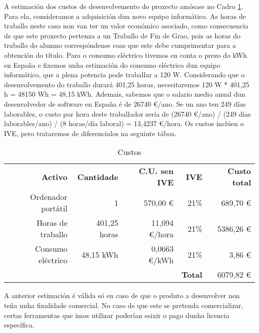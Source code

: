 A estimación dos custos de desenvolvemento do proxecto amósase no Cadro \ref{tab:custosLabel}. Para ela, consideramos a adquisición dun novo equipo informático. As horas de traballo neste caso non van ter un valor económico asociado, como consecuencia de que este proxecto pertenza a un Traballo de Fin de Grao, pois as horas do traballo do alumno correspóndense coas que este debe cumprimentar para a obtención do título. Para o consumo eléctrico tivemos en conta o prezo do kWh en España \cite{preciokWh_espana} e fixemos unha estimación \cite{energyusecalculator} do consumo eléctrico dun equipo informático, que a plena potencia pode traballar a 120 W. Considerando que o desenvolvemento do traballo durará 401,25 horas, necesitaremos 120 W * 401,25 h = 48150 Wh = 48,15 kWh. Ademais, sabemos que o salario medio anual dun desenvolvedor de software en España é de 26740 €/ano. Se un ano ten 249 días laborables, o custo por hora deste traballador sería de (26740 \euro/ano) / (249 días laborables/ano) / (8 horas/día laboral) = 13,4237 \euro/hora. Os custos inclúen o IVE, pero trataremos de diferencialos na seguinte táboa.

\begin{table}[htbp]
  \centering
    \begin{tabular}{rrrrr}
    \textbf{Activo} & \textbf{Cantidade} & \textbf{C.U. sen IVE} & \textbf{IVE} & \textbf{Custo total} \\
    Ordenador portátil & 1     & 570,00 \euro & 21\%  & 689,70 \euro \\
    Horas de traballo & 401,25 horas & 11,094 \euro/hora & 21\%  & 5386,26 \euro \\
    Consumo eléctrico & 48,15 kWh & 0,0663 \euro/kWh & 21\%  & 3,86 \euro \\
          &       &       & \textbf{Total} & 6079,82 \euro \\
    \end{tabular}%
		\caption{Custos}
  \label{tab:custosLabel}%
\end{table}%

A anterior estimación é válida só en caso de que o produto a desenvolver non teña unha finalidade comercial. No caso de que este se pretenda comercializar, certas ferramentas que imos utilizar poderían esixir o pago dunha licencia específica.
